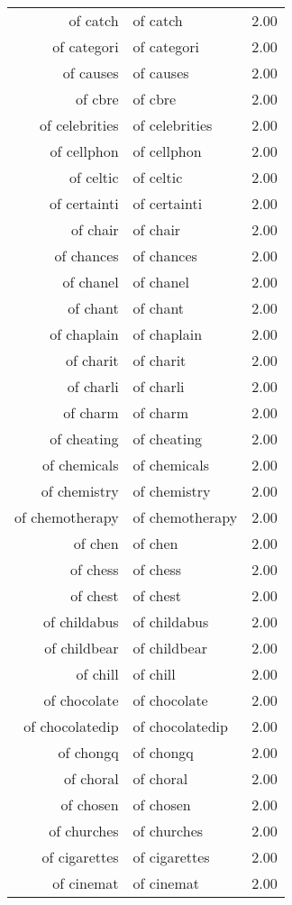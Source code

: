 \begin{table}[ht]
\begin{tabular}{rlr}
  of catch & of catch & 2.00 \\ 
  of categori & of categori & 2.00 \\ 
  of causes & of causes & 2.00 \\ 
  of cbre & of cbre & 2.00 \\ 
  of celebrities & of celebrities & 2.00 \\ 
  of cellphon & of cellphon & 2.00 \\ 
  of celtic & of celtic & 2.00 \\ 
  of certainti & of certainti & 2.00 \\ 
  of chair & of chair & 2.00 \\ 
  of chances & of chances & 2.00 \\ 
  of chanel & of chanel & 2.00 \\ 
  of chant & of chant & 2.00 \\ 
  of chaplain & of chaplain & 2.00 \\ 
  of charit & of charit & 2.00 \\ 
  of charli & of charli & 2.00 \\ 
  of charm & of charm & 2.00 \\ 
  of cheating & of cheating & 2.00 \\ 
  of chemicals & of chemicals & 2.00 \\ 
  of chemistry & of chemistry & 2.00 \\ 
  of chemotherapy & of chemotherapy & 2.00 \\ 
  of chen & of chen & 2.00 \\ 
  of chess & of chess & 2.00 \\ 
  of chest & of chest & 2.00 \\ 
  of childabus & of childabus & 2.00 \\ 
  of childbear & of childbear & 2.00 \\ 
  of chill & of chill & 2.00 \\ 
  of chocolate & of chocolate & 2.00 \\ 
  of chocolatedip & of chocolatedip & 2.00 \\ 
  of chongq & of chongq & 2.00 \\ 
  of choral & of choral & 2.00 \\ 
  of chosen & of chosen & 2.00 \\ 
  of churches & of churches & 2.00 \\ 
  of cigarettes & of cigarettes & 2.00 \\ 
  of cinemat & of cinemat & 2.00 \\ 

\end{tabular}
\end{table}
